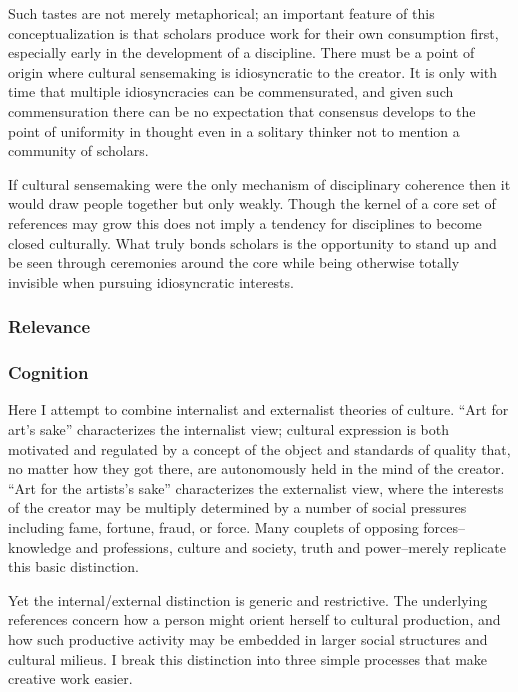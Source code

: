 Such tastes are not merely metaphorical; an important feature of this
conceptualization is that scholars produce work for their own
consumption first, especially early in the development of a discipline.
There must be a point of origin where cultural sensemaking is
idiosyncratic to the creator. It is only with time that multiple
idiosyncracies can be commensurated, and given such commensuration there
can be no expectation that consensus develops to the point of uniformity
in thought even in a solitary thinker not to mention a community of
scholars.

If cultural sensemaking were the only mechanism of disciplinary
coherence then it would draw people together but only weakly. Though the
kernel of a core set of references may grow this does not imply a
tendency for disciplines to become closed culturally. What truly bonds
scholars is the opportunity to stand up and be seen through ceremonies
around the core while being otherwise totally invisible when pursuing
idiosyncratic interests.

\subsubsection{Relevance}\label{relevance}

\subsubsection{Cognition}\label{cognition}

Here I attempt to combine internalist and externalist theories of
culture. ``Art for art's sake'' characterizes the internalist view;
cultural expression is both motivated and regulated by a concept of the
object and standards of quality that, no matter how they got there, are
autonomously held in the mind of the creator. ``Art for the artists's
sake'' characterizes the externalist view, where the interests of the
creator may be multiply determined by a number of social pressures
including fame, fortune, fraud, or force. Many couplets of opposing
forces--knowledge and professions, culture and society, truth and
power--merely replicate this basic distinction.

Yet the internal/external distinction is generic and restrictive. The
underlying references concern how a person might orient herself to
cultural production, and how such productive activity may be embedded in
larger social structures and cultural milieus. I break this distinction
into three simple processes that make creative work easier.

